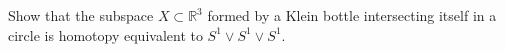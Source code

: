 \documentclass[12pt]{article}
\begin{document}
\begin{hatcher}[0.16]
    
\end{hatcher}

\begin{hatcher}[0.17]
    
\end{hatcher}

\begin{hatcher}[0.20]
    Show that the subspace $X \subset \mathbb{R}^3$ formed by a Klein bottle intersecting itself in a circle is homotopy equivalent to $S^1 \vee S^1 \vee S^1$.
\end{hatcher}






\end{document}
